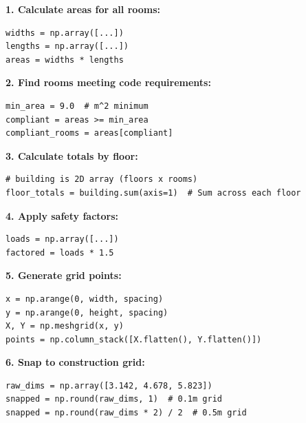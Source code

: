 \begin{tcolorbox}[
    title=Patterns You'll Use Often,
    colframe=gray,
    colback = white,
    arc=2mm
]
\textbf{1. Calculate areas for all rooms:}
\begin{lstlisting}[basicstyle=\ttfamily\footnotesize,breaklines=true,columns=fullflexible,keepspaces=true,xleftmargin=0pt]
widths = np.array([...])
lengths = np.array([...])
areas = widths * lengths

\end{lstlisting}

\textbf{2. Find rooms meeting code requirements:}
\begin{lstlisting}[basicstyle=\ttfamily\footnotesize,breaklines=true,columns=fullflexible,keepspaces=true,xleftmargin=0pt]
min_area = 9.0  # m^2 minimum
compliant = areas >= min_area
compliant_rooms = areas[compliant]

\end{lstlisting}

\textbf{3. Calculate totals by floor:}
\begin{lstlisting}[basicstyle=\ttfamily\footnotesize,breaklines=true,columns=fullflexible,keepspaces=true,xleftmargin=0pt]
# building is 2D array (floors x rooms)
floor_totals = building.sum(axis=1)  # Sum across each floor

\end{lstlisting}

\textbf{4. Apply safety factors:}
\begin{lstlisting}[basicstyle=\ttfamily\footnotesize,breaklines=true,columns=fullflexible,keepspaces=true,xleftmargin=0pt]
loads = np.array([...])
factored = loads * 1.5

\end{lstlisting}

\textbf{5. Generate grid points:}
\begin{lstlisting}[basicstyle=\ttfamily\footnotesize,breaklines=true,columns=fullflexible,keepspaces=true,xleftmargin=0pt]
x = np.arange(0, width, spacing)
y = np.arange(0, height, spacing)
X, Y = np.meshgrid(x, y)
points = np.column_stack([X.flatten(), Y.flatten()])

\end{lstlisting}

\textbf{6. Snap to construction grid:}
\begin{lstlisting}[basicstyle=\ttfamily\footnotesize,breaklines=true,columns=fullflexible,keepspaces=true,xleftmargin=0pt]
raw_dims = np.array([3.142, 4.678, 5.823])
snapped = np.round(raw_dims, 1)  # 0.1m grid
snapped = np.round(raw_dims * 2) / 2  # 0.5m grid

\end{lstlisting}
\end{tcolorbox}

